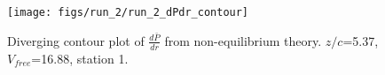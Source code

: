 \begin{figure}[H]
\centering
\texttt{[image: figs/run\_2/run\_2\_dPdr\_contour]}
\caption{Diverging contour plot of $\frac{d\bar{P}}{dr}$ from non-equilibrium theory. $z/c$=5.37, $V_{free}$=16.88, station 1.}
\label{fig:run_2_dPdr_contour}
\end{figure}


